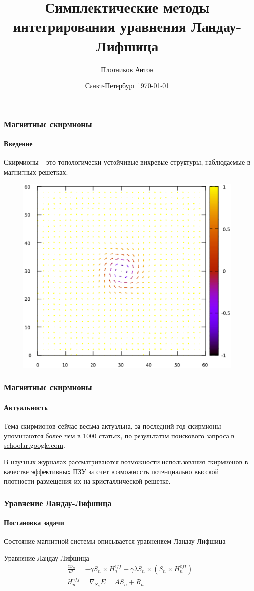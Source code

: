 \documentclass[t]{beamer}
\title[Симп. мет. инт. ур-я Ландау-Лифшица]{Симплектические методы интегрирования\linebreak
    уравнения Ландау-Лифшица}
\author{Плотников Антон}
\date{Санкт-Петербург \today}
\begin{document}
\frame[plain]{\titlepage}

\begin{frame}
\frametitle{Магнитные скирмионы}
\framesubtitle{Введение}
    Скирмионы -- это топологически устойчивые вихревые структуры, наблюдаемые в
    магнитных решетках.

    \begin{figure}
        \centering
        \includegraphics[scale=0.3]{../img/simple_skyrmion_1}
    \end{figure}
\end{frame}

\begin{frame}
    \frametitle{Магнитные скирмионы}
    \framesubtitle{Актуальность}
    Тема скирмионов сейчас весьма актуальна, за последний год скирмионы
    упоминаются более чем в 1000 статьях, по результатам поискового запроса в
    \url{schoolar.google.com}.

    В научных журналах рассматриваются возможности использования скирмионов в
    качестве эффективных ПЗУ за счет возможность потенциально высокой плотности
    размещения их на кристаллической решетке.
\end{frame}

\begin{frame}
\frametitle{Уравнение Ландау-Лифшица}
\framesubtitle{Постановка задачи}

Состояние магнитной системы описывается уравнением Ландау-Лифшица

\begin{block}{Уравнение Ландау-Лифшица}
\begin{align*}
    &\frac{dS_n}{dt} = -\gamma S_n \times H^{eff}_n - \gamma\lambda S_n \times
    \left(S_n\times H^{eff}_n \right)
    \\
    &H^{eff}_n = \nabla_{S_n}E = AS_n + B_n
\end{align*}
\end{block}
\end{frame}
\end{document}
